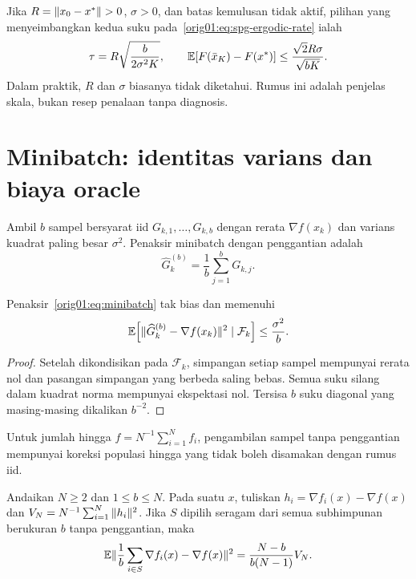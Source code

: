 Jika $R=\norm{x_0-x^*}>0$, $\sigma>0$, dan batas kemulusan tidak aktif,
pilihan yang
menyeimbangkan kedua suku pada~\eqref{orig01:eq:spg-ergodic-rate} ialah
\begin{equation}
  \tau=R\sqrt{\frac{b}{2\sigma^2K}},
  \qquad
  \mathbb{E}[F(\bar x_K)-F(x^*)]
  \leq\frac{\sqrt2R\sigma}{\sqrt{bK}}.
\end{equation}
Dalam praktik, $R$ dan $\sigma$ biasanya tidak diketahui. Rumus ini adalah
penjelas skala, bukan resep penalaan tanpa diagnosis.

\section{Minibatch: identitas varians dan biaya oracle}
\label{orig01:section:minibatch}

Ambil $b$ sampel bersyarat iid $G_{k,1},\dots,G_{k,b}$ dengan rerata
$\nabla f(x_k)$ dan varians kuadrat paling besar $\sigma^2$. Penaksir
minibatch dengan penggantian adalah
\begin{equation}
  \label{orig01:eq:minibatch}
  \widehat G_k^{(b)}=\frac1b\sum_{j=1}^{b}G_{k,j}.
\end{equation}

\begin{prop}
  \label{orig01:prop:minibatch-with-replacement}
  Penaksir~\eqref{orig01:eq:minibatch} tak bias dan memenuhi
  \begin{equation}
    \mathbb{E}\!\left[
      \|\widehat G_k^{(b)}-\nabla f(x_k)\|^2
      \mid\mathcal F_k
    \right]\leq\frac{\sigma^2}{b}.
  \end{equation}
\end{prop}

\begin{proof}
  Setelah dikondisikan pada $\mathcal F_k$, simpangan setiap sampel mempunyai
  rerata nol dan pasangan simpangan yang berbeda saling bebas. Semua suku
  silang dalam kuadrat norma mempunyai ekspektasi nol. Tersisa $b$ suku
  diagonal yang masing-masing dikalikan $b^{-2}$.
\end{proof}

Untuk jumlah hingga $f=N^{-1}\sum_{i=1}^{N}f_i$, pengambilan sampel tanpa
penggantian mempunyai koreksi populasi hingga yang tidak boleh disamakan
dengan rumus iid.

\begin{prop}
  \label{orig01:prop:finite-population}
  Andaikan $N\geq2$ dan $1\leq b\leq N$. Pada suatu $x$, tuliskan
  $h_i=\nabla f_i(x)-\nabla f(x)$ dan
  $V_N=N^{-1}\sum_{i=1}^{N}\|h_i\|^2$. Jika $S$ dipilih seragam dari semua
  subhimpunan berukuran $b$ tanpa penggantian, maka
  \begin{equation}
    \label{orig01:eq:finite-population}
    \mathbb{E}\|\frac1b\sum_{i\in S}\nabla f_i(x)-\nabla f(x)\|^2
    =\frac{N-b}{b(N-1)}V_N.
  \end{equation}
\end{prop}

